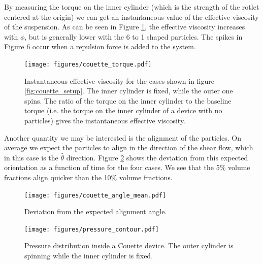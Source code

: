 \documentclass[preprint, 10pt]{elsarticle}
\begin{document}
By measuring the torque on the inner cylinder (which is the strength of the rotlet centered at the origin) we can get an instantaneous value of the effective viscosity of the suspension. As can be seen in Figure \ref{fig:torque}, the effective viscosity increases with $\phi$, but is generally lower with the 6 to 1 shaped particles. The spikes in Figure 6 occur when a repulsion force is added to the system. 
\begin{figure}[!h]
\begin{center}
\texttt{[image: figures/couette\_torque.pdf]}\\
\end{center}
\caption{Instantaneous effective viscosity for the cases shown in figure \ref{fig:couette_setup}. The inner cylinder is fixed, while the outer one spins. The ratio of the torque on the inner cylinder to the baseline torque (i.e. the torque on the inner cylinder of a device with no particles) gives the instantaneous effective viscosity.}\label{fig:torque}
\end{figure} 

Another quantity we may be interested is the alignment of the particles. On average we expect the particles to align in the direction of the shear flow, which in this case is the $\hat{\theta}$ direction. Figure \ref{fig:angles} shows the deviation from this expected orientation as a function of time for the four cases. We see that the 5\% volume fractions align quicker than the 10\% volume fractions. 

\begin{figure}[!h]
\begin{center}
\texttt{[image: figures/couette\_angle\_mean.pdf]}\\
\end{center}
\caption{Deviation from the expected alignment angle. }\label{fig:angles}
\end{figure} 

\begin{figure}[!h]
\begin{center}
\texttt{[image: figures/pressure\_contour.pdf]}
\end{center}
\caption{Pressure distribution inside a Couette device. The outer cylinder is spinning while the inner cylinder is fixed. }\label{fig:dissipation}
\end{figure}


\end{document}

